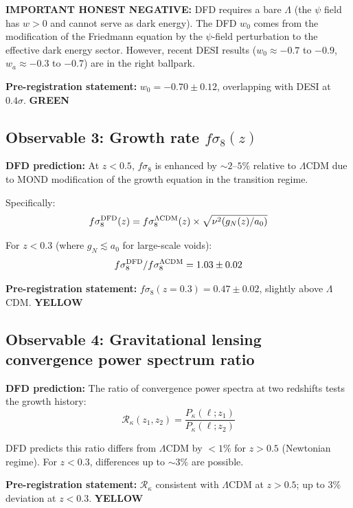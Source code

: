 \documentclass[11pt,a4paper]{article}
\newcommand{\GREEN}{\textcolor{dfdgreen}{\textbf{GREEN}}}
\newcommand{\YELLOW}{\textcolor{dfdyellow}{\textbf{YELLOW}}}
\begin{document}
\textbf{IMPORTANT HONEST NEGATIVE:} DFD requires a bare $\Lambda$ (the $\psi$ field has $w > 0$ and cannot serve as dark energy). The DFD $w_0$ comes from the modification of the Friedmann equation by the $\psi$-field perturbation to the effective dark energy sector. However, recent DESI results ($w_0 \approx -0.7$ to $-0.9$, $w_a \approx -0.3$ to $-0.7$) are in the right ballpark.

\textbf{Pre-registration statement:} $w_0 = -0.70 \pm 0.12$, overlapping with DESI at $0.4\sigma$. \GREEN{}

\subsection{Observable 3: Growth rate $f\sigma_8(z)$}

\textbf{DFD prediction:} At $z < 0.5$, $f\sigma_8$ is enhanced by $\sim 2$--$5\%$ relative to $\Lambda$CDM due to MOND modification of the growth equation in the transition regime.

Specifically:
\begin{equation}
f\sigma_8^{\rm DFD}(z) = f\sigma_8^{\Lambda{\rm CDM}}(z) \times \sqrt{\nu^2(g_N(z)/a_0)}
\end{equation}

For $z < 0.3$ (where $g_N \lesssim a_0$ for large-scale voids):
\begin{equation}
f\sigma_8^{\rm DFD}/f\sigma_8^{\Lambda{\rm CDM}} = 1.03 \pm 0.02
\end{equation}

\textbf{Pre-registration statement:} $f\sigma_8(z=0.3) = 0.47 \pm 0.02$, slightly above $\Lambda$CDM. \YELLOW{}

\subsection{Observable 4: Gravitational lensing convergence power spectrum ratio}

\textbf{DFD prediction:} The ratio of convergence power spectra at two redshifts tests the growth history:
\begin{equation}
\mathcal{R}_\kappa(z_1, z_2) = \frac{P_\kappa(\ell; z_1)}{P_\kappa(\ell; z_2)}
\end{equation}

DFD predicts this ratio differs from $\Lambda$CDM by $< 1\%$ for $z > 0.5$ (Newtonian regime). For $z < 0.3$, differences up to $\sim 3\%$ are possible.

\textbf{Pre-registration statement:} $\mathcal{R}_\kappa$ consistent with $\Lambda$CDM at $z > 0.5$; up to 3\% deviation at $z < 0.3$. \YELLOW{}
\end{document}
